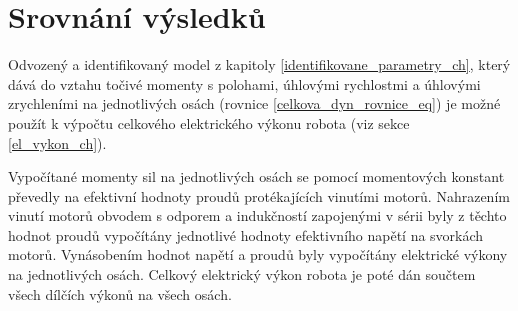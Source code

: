 \chapter{Srovnání výsledků}

Odvozený a identifikovaný model z kapitoly \ref{identifikovane_parametry_ch}, který dává do vztahu točivé momenty s polohami, úhlovými rychlostmi a úhlovými zrychleními na jednotlivých osách (rovnice \ref{celkova_dyn_rovnice_eq}) je možné použít k výpočtu celkového elektrického výkonu robota (viz sekce \ref{el_vykon_ch}).

Vypočítané momenty sil na jednotlivých osách se pomocí momentových konstant převedly na efektivní hodnoty proudů protékajících vinutími motorů. Nahrazením vinutí motorů obvodem s odporem a indukčností zapojenými v sérii byly z těchto hodnot proudů vypočítány jednotlivé hodnoty efektivního napětí na svorkách motorů. Vynásobením hodnot napětí a proudů byly vypočítány elektrické výkony na jednotlivých osách. Celkový elektrický výkon robota je poté dán součtem všech dílčích výkonů na všech osách.  